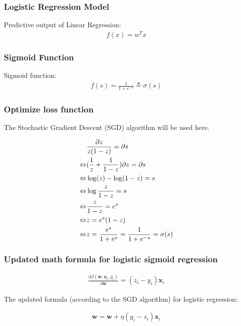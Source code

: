 \subsubsection{Logistic Regression Model}
Predictive output of Linear Regression:
\begin{align}
	f(x) = w^T x
\end{align}

\subsubsection{Sigmoid Function}
Sigmoid function:
\begin{align}
    f(s) = \frac{1}{1 + e^{-s}} \triangleq \sigma(s)
\end{align}

\subsubsection{Optimize loss function}
The Stochastic Gradient Descent (SGD) algorithm will be used here.

\begin{align}
    & \frac{\partial z}{z(1-z)} = \partial s \\ 
	\Leftrightarrow & (\frac{1}{z} + \frac{1}{1 - z})\partial z = \partial s \notag \\  
	\Leftrightarrow & \log(z) - \log(1 - z) = s \notag \\ 
	\Leftrightarrow & \log \frac{z}{1 - z} = s \notag \\
	\Leftrightarrow & \frac{z}{1 - z} = e^s \notag \\
	\Leftrightarrow & z = e^s (1 - z) \notag \\
	\Leftrightarrow & z = \frac{e^s}{1 +e^s} = \frac{1}{1 + e^{-s}} = \sigma(s) \notag 
\end{align}

\subsubsection{Updated math formula for logistic sigmoid regression}
\begin{align}
    \frac{\partial J(\mathbf{w}; \mathbf{x}_i, y_i)}{\partial \mathbf{w}} = (z_i - y_i)\mathbf{x}_i
\end{align}
    
The updated formula (according to the SGD algorithm) for logistic regression:

\begin{align}
    \mathbf{w} = \mathbf{w} + \eta(y_i - z_i)\mathbf{x}_i
\end{align}
	
